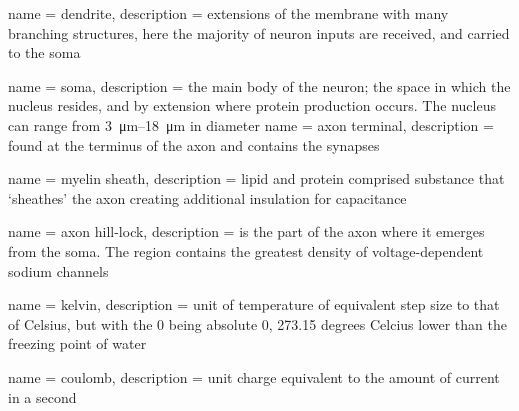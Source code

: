 

\usepackage{glossaries}

\makeglossaries

{
        name = {dendrite},
        description = {extensions of the membrane with many branching structures, here the majority of neuron inputs are received, and carried to the soma}
}

{
        name = {soma},
        description = {the main body of the neuron; the space in which the nucleus resides, and by extension where protein production occurs. The nucleus can range from \qtyrange{3}{18}{\um} in diameter}
}
{
        name = {axon terminal},
        description = {found at the terminus of the axon and contains the synapses}
}


{
        name = {myelin sheath},
        description = { lipid and protein comprised substance that `sheathes' the axon creating additional insulation for capacitance}
}

{
        name = {axon hill-lock},
        description = {is the part of the axon where it emerges from the soma. The region contains the greatest density of voltage-dependent sodium channels}
}


{
        name = {kelvin},
        description = {unit of temperature of equivalent step size to that of Celsius, but with the 0 being absolute 0, 273.15 degrees Celcius lower than the freezing point of water}
}

{
        name = {coulomb},
        description = {unit charge equivalent to the amount of current in a second}
}

